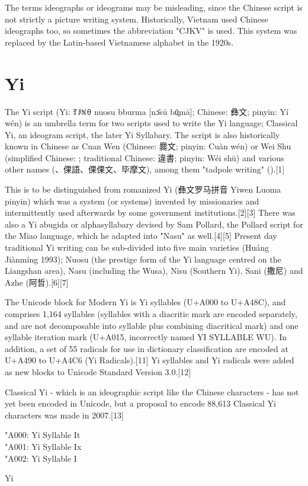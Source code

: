 The terms ideographs or ideograms may be misleading, since the Chinese script is not strictly a picture writing system.
Historically, Vietnam used Chinese ideographs too, so sometimes the abbreviation "CJKV" is used. This system was replaced by the Latin-based Vietnamese alphabet in the 1920s.







\section{Yi}
\label{s:yi}

The Yi script (Yi: {\yi ꆈꌠꁱꂷ} nuosu bburma [nɔ̄sū bū̠mā]; Chinese: {\cjk 彝文}; pinyin: Yí wén) is an umbrella term for two scripts used to write the Yi language; Classical Yi, an ideogram script, the later Yi Syllabary. The script is also historically known in Chinese as Cuan Wen (Chinese: {\cjk 爨文}; pinyin: Cuàn wén) or Wei Shu (simplified Chinese: {}; traditional Chinese: {\cjk 違書}; pinyin: Wéi shū) and various other names ({、倮語、倮倮文、毕摩文}), among them "tadpole writing" ({}).[1]

This is to be distinguished from romanized Yi ({\yi 彝文罗马拼音} Yiwen Luoma pinyin) which was a system (or systems) invented by missionaries and intermittently used afterwards by some government institutions.[2][3] There was also a Yi abugida or alphasyllabary devised by Sam Pollard, the Pollard script for the Miao language, which he adapted into "Nasu" as well.[4][5] Present day traditional Yi writing can be sub-divided into five main varieties (Huáng Jiànmíng 1993); Nuosu (the prestige form of the Yi language centred on the Liangshan area), Nasu (including the Wusa), Nisu (Southern Yi), Sani (撒尼) and Azhe (阿哲).[6][7]

The Unicode block for Modern Yi is Yi syllables (U+A000 to U+A48C), and comprises 1,164 syllables (syllables with a diacritic mark are encoded separately, and are not decomposable into syllable plus combining diacritical mark) and one syllable iteration mark (U+A015, incorrectly named YI SYLLABLE WU). In addition, a set of 55 radicals for use in dictionary classification are encoded at U+A490 to U+A4C6 (Yi Radicals).[11] Yi syllables and Yi radicals were added as new blocks to Unicode Standard Version 3.0.[12]

Classical Yi - which is an ideographic script like the Chinese characters - has not yet been encoded in Unicode, but a proposal to encode 88,613 Classical Yi characters was made in 2007.[13]

\bgroup
\yi \char"A000: Yi Syllable It\\

\yi \char"A001: Yi Syllable Ix\\

\yi \char"A002: Yi Syllable I\\
\egroup

\begin{scriptexample}[]{Yi}
\end{scriptexample}


